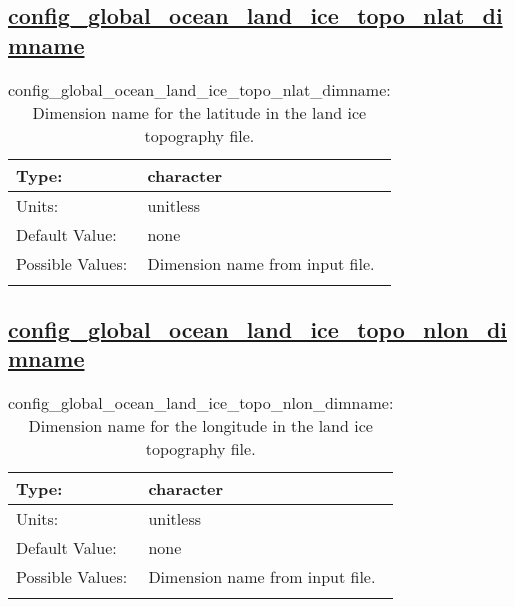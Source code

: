 \subsection[config\_global\_ocean\_land\_ice\_topo\_nlat\_dimname]{\hyperref[sec:nm_tab_global_ocean]{config\_global\_ocean\_land\_ice\_topo\_nlat\_dimname}}
\label{subsec:nm_sec_config_global_ocean_land_ice_topo_nlat_dimname}
\begin{center}
\begin{longtable}{| p{2.0in} || p{4.0in} |}
    \hline
    Type: & character \\
    \hline
    Units: & \si{unitless} \\
    \hline
    Default Value: & none \\
    \hline
    Possible Values: & Dimension name from input file. \\
    \hline
    \caption{config\_global\_ocean\_land\_ice\_topo\_nlat\_dimname: Dimension name for the latitude in the land ice topography file.}
\end{longtable}
\end{center}
\subsection[config\_global\_ocean\_land\_ice\_topo\_nlon\_dimname]{\hyperref[sec:nm_tab_global_ocean]{config\_global\_ocean\_land\_ice\_topo\_nlon\_dimname}}
\label{subsec:nm_sec_config_global_ocean_land_ice_topo_nlon_dimname}
\begin{center}
\begin{longtable}{| p{2.0in} || p{4.0in} |}
    \hline
    Type: & character \\
    \hline
    Units: & \si{unitless} \\
    \hline
    Default Value: & none \\
    \hline
    Possible Values: & Dimension name from input file. \\
    \hline
    \caption{config\_global\_ocean\_land\_ice\_topo\_nlon\_dimname: Dimension name for the longitude in the land ice topography file.}
\end{longtable}
\end{center}
